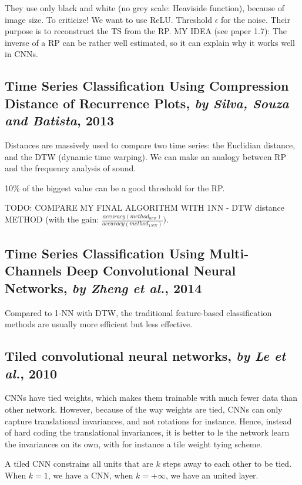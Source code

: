 \documentclass[11pt]{article}
\begin{document}
\begin{onehalfspace}
They use only black and white (no grey scale: Heaviside function), because of image size. To criticize! We want to use ReLU. Threshold $\epsilon$ for the noise. Their purpose is to reconstruct the TS from the RP. MY IDEA (see paper 1.7): The inverse of a RP can be rather well estimated, so it can explain why it works well in CNNs.

\subsection{Time Series Classiﬁcation Using Compression Distance of Recurrence Plots, \textit{by Silva, Souza and Batista}, 2013}

Distances are massively used to compare two time series: the Euclidian distance, and the DTW (dynamic time warping). We can make an analogy between RP and the frequency analysis of sound.

10\% of the biggest value can be a good threshold for the RP.

TODO: COMPARE MY FINAL ALGORITHM WITH 1NN - DTW distance METHOD (with the gain: $\frac{accuracy(method_{new})}{accuracy(method_{1NN})})$.

\subsection{Time Series Classification Using Multi-Channels
Deep Convolutional Neural Networks, \textit{by Zheng et al.}, 2014}

Compared to 1-NN with DTW, the traditional feature-based classification methods are usually more efficient but less effective.

\subsection{Tiled convolutional neural networks, \textit{by Le et al.}, 2010}

CNNs have tied weights, which makes them trainable with much fewer data than other network. However, because of the way weights are tied, CNNs can only capture translational invariances, and not rotations for instance. Hence, instead of hard coding the translational invariances, it is better to le the network learn the invariances on its own, with for instance a tile weight tying scheme.

A tiled CNN constrains all units that are $k$ steps away to each other to be tied. When $k=1$, we have a CNN, when $k=+\infty$, we have an united layer.


\end{onehalfspace}
\end{document}
